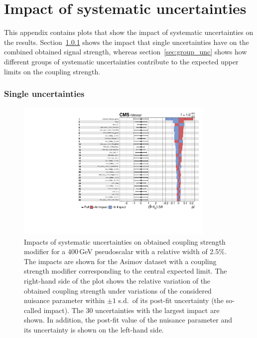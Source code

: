 \graphicspath{{chapt_dutch/}{intro/}{chapt2/}{chapt3/}{chapt4/}{chapt5/}{chapt6/}{chapt7/}}

\renewcommand\evenpagerightmark{{\scshape\small Appendix D}}
\renewcommand\oddpageleftmark{{\scshape\small Impact of systematic uncertainties}}

\renewcommand{\bibname}{References}

\hyphenation{}

\chapter[Impact of systematic uncertainties]%
{Impact of systematic uncertainties}\label{app5}
%
This appendix contains plots that show the impact of systematic uncertainties on the results.
Section~\ref{sec:single_unc} shows the impact that single uncertainties have on the combined obtained signal strength, whereas section~\ref{sec:group_unc} shows how different groups of systematic uncertainties contribute to the expected upper limits on the coupling strength.

\subsection{Single uncertainties}
\label{sec:single_unc}

\begin{figure}[!Hhtb]
\centering
\includegraphics[width=0.85\textwidth,keepaspectratio=true]{fig/app5/impacts/impacts_400.pdf}
\caption{Impacts of systematic uncertainties on obtained coupling strength modifier for a 400\,GeV pseudoscalar with a relative width of 2.5\%. The impacts are shown for the Asimov dataset with a coupling strength modifier corresponding to the central expected limit. The right-hand side of the plot shows the relative variation of the obtained coupling strength under variations of the considered nuisance parameter within $\pm 1$ s.d.\ of its post-fit uncertainty (the so-called impact). The 30 uncertainties with the largest impact are shown. In addition, the post-fit value of the nuisance parameter and its uncertainty is shown on the left-hand side.}
\label{fig:impacts_m400}
\end{figure}

